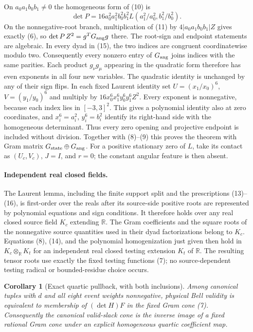 \documentclass[11pt]{article}
\newtheorem{corollary}{Corollary}
\newcommand{\R}{\mathbb R}
\begin{document}
On $a_0a_1b_0b_1\ne0$ the homogeneous form of (10) is
\[
 \det P=16a_0^2a_1^2b_0^2b_1^2
 L(a_1^2/a_0^2,b_1^2/b_0^2).
\]
On the nonnegative-root branch, multiplication of (11) by
$4|a_0a_1b_0b_1|Z$ gives exactly (6), so
$\det P\,Z^2=g^TG_{\rm ang}g$ there.
The root-sign and endpoint statements are algebraic.  In every dyad in
(15), the two indices are congruent coordinatewise modulo two.
Consequently every nonzero entry of $G_{\rm ang}$ joins indices with
the same parities.  Each product $g_\nu g_\mu$ appearing in the quadratic
form therefore has even exponents in all four new variables.  The
quadratic identity is unchanged by any of their sign flips.
In each fixed Laurent identity
set $U=(x_1/x_0)^6$, $V=(y_1/y_0)^6$ and multiply by
$16x_0^6x_1^6y_0^6y_1^6Z^2$.  Every exponent is nonnegative, because
each index lies in $[-3,3]^2$.  This gives a polynomial identity also
at zero coordinates, and $x_i^6=a_i^2$, $y_i^6=b_i^2$ identify its
right-hand side with the homogeneous determinant.  Thus every zero
opening and projective endpoint is included without division.
Together with (8)--(9)
this proves the theorem with Gram matrix
$G_{\rm state}\oplus G_{\rm ang}$.
For a positive stationary zero of $L$, take its contact as $(U_c,V_c)$,
$J=I$, and $r=0$; the constant angular feature is then absent.

\paragraph{Independent real closed fields.}
The Laurent lemma, including the finite support split and the
prescriptions (13)--(16), is first-order over the reals after its
source-side positive roots are represented by polynomial equations and
sign conditions.
It therefore holds over any real closed source field $K_c$ extending
$\R$.  The Gram coefficients and the square roots of the nonnegative
source quantities used in their dyad factorizations belong to $K_c$. Equations
(8), (14), and the polynomial homogenization just given then hold in
$K_c\otimes_{\R}K_t$ for an independent real closed testing extension
$K_t$ of $\R$.
The resulting tensor roots use exactly the fixed testing functions (7);
no source-dependent testing radical or bounded-residue choice occurs.

\begin{corollary}[Exact quartic pullback, with both inclusions]
Among canonical tuples with $d$ and all eight event weights nonnegative,
physical Bell validity is
equivalent to membership of $(\det H)F$ in the fixed Gram cone (7).
Consequently the canonical valid-slack cone is the inverse image of a
fixed rational Gram cone under an explicit homogeneous quartic
coefficient map.
\end{corollary}
\end{document}
